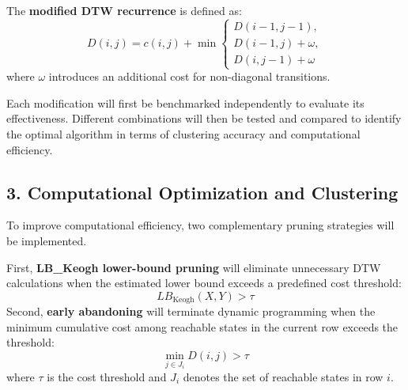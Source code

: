 \documentclass[11pt,a4paper]{article}
\begin{document}
The \textbf{modified DTW recurrence} is defined as:
\begin{equation}
\boxed{D(i,j)=c(i,j)+\min\begin{cases}
D(i-1,j-1),\\
D(i-1,j)+\omega,\\
D(i,j-1)+\omega
\end{cases}}
\end{equation}
where $\omega$ introduces an additional cost for non-diagonal transitions.

Each modification will first be benchmarked independently to evaluate its effectiveness. Different combinations will then be tested and compared to identify the optimal algorithm in terms of clustering accuracy and computational efficiency.

\subsection*{3. Computational Optimization and Clustering}
To improve computational efficiency, two complementary pruning strategies will be implemented.

First, \textbf{LB\_Keogh lower-bound pruning} will eliminate unnecessary DTW calculations when the estimated lower bound exceeds a predefined cost threshold:
\begin{equation}
\boxed{LB_{\mathrm{Keogh}}(X,Y)>\tau}
\end{equation}
Second, \textbf{early abandoning} will terminate dynamic programming when the minimum cumulative cost among reachable states in the current row exceeds the threshold:
\begin{equation}
\boxed{\min_{j\in J_i}D(i,j)>\tau}
\end{equation}
where $\tau$ is the cost threshold and $J_i$ denotes the set of reachable states in row $i$.
\end{document}
